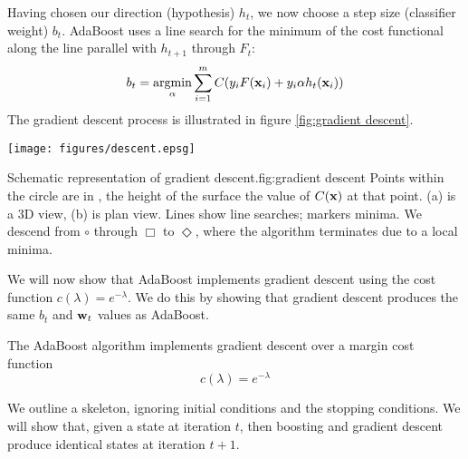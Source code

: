 Having chosen our direction (hypothesis) $h_t$, we now choose a step
size (classifier weight) $b_t$.  AdaBoost uses a line search for the
minimum of the cost functional along the line parallel with $h_{t+1}$
through $F_t$:
%
\begin{equation}
b_t = \argmin_{\alpha} \sum_{i=1}^{m} C(y_i F(\bfx_i) + y_i \alpha
h_t(\bfx_i))
\end{equation}
%
The gradient descent process is illustrated in figure
\ref{fig:gradient descent}.

\begin{linefigure}
\begin{center}
\texttt{[image: figures/descent.epsg]}
\end{center}
\begin{capt}{Schematic representation of gradient
descent.}{fig:gradient descent}
Points within the circle are in \calH, the height of the surface
the value of $C(\mathbf{x})$ at that point.  (a) is a 3D view, (b) is plan
view. Lines show line searches; markers minima.  We descend from
$\circ$ through $\Box$ to $\Diamond$, where the algorithm terminates
due to a local minima.
\end{capt}
\end{linefigure}

We will now show that AdaBoost implements gradient descent using the
cost function $c(\lambda) = e^{-\lambda}$.  We do this by showing that
gradient descent produces the same $b_t$ and $\mathbf{w}_t$ values as
AdaBoost.

\begin{theorem}
\label{thm:adaboost gradient descent}
The AdaBoost algorithm implements gradient descent over a margin cost
function
%
\begin{equation}
\label{eqn:adaboost margin cost function}
c(\lambda) = e^{-\lambda}
\end{equation}
\end{theorem}

\proof We outline a skeleton, ignoring initial conditions and the
stopping conditions.  We will show that, given a state at iteration
$t$, then boosting and gradient descent produce identical states at
iteration $t+1$.

